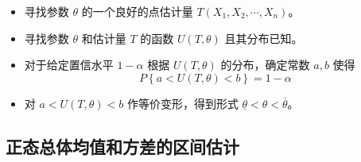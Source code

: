 \begin{itemize}[leftmargin=\paritemindent]
    \item 寻找参数 $ \theta $ 的一个良好的点估计量 $ T(X_1, X_2, \cdots, X_n) $。
    \item 寻找参数 $ \theta $ 和估计量 $ T $ 的函数 $ U(T,\theta) $ 且其分布已知。
    \item 对于给定置信水平 $ 1 - \alpha $ 根据 $ U(T,\theta) $ 的分布，确定常数 $ a,b $ 使得
    $$ P\left\{ a < U(T,\theta) < b \right\} = 1 - \alpha $$
    \item 对 $ a < U(T,\theta) < b $ 作等价变形，得到形式 $ \underline{\theta} < \theta < \overline{\theta} $。
\end{itemize}

\subsection{正态总体均值和方差的区间估计}

